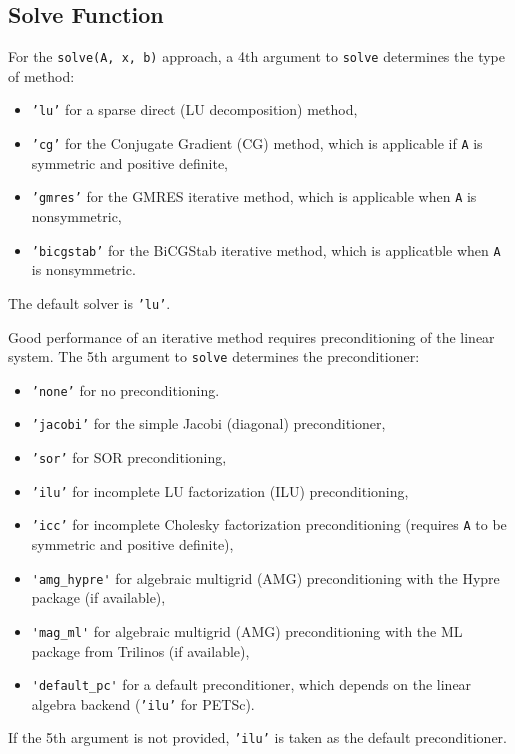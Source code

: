 \subsection{Solve Function}

For the {\fontsize{12pt}{12pt}\texttt{solve(A, x, b)}} approach, a 4th argument to {\fontsize{12pt}{12pt}\texttt{solve}}
determines the type of method: 
\begin{itemize}
\item {\fontsize{12pt}{12pt}\texttt{'lu'}} for a sparse direct (LU decomposition) method, 
\item {\fontsize{12pt}{12pt}\texttt{'cg'}} for the Conjugate Gradient (CG) method, which is
applicable if {\fontsize{12pt}{12pt}\texttt{A}} is symmetric and positive definite,
\item {\fontsize{12pt}{12pt}\texttt{'gmres'}} for
the GMRES iterative method, which is applicable when {\fontsize{12pt}{12pt}\texttt{A}} is nonsymmetric,
\item {\fontsize{12pt}{12pt}\texttt{'bicgstab'}} for
the BiCGStab iterative method, which is applicatble when {\fontsize{12pt}{12pt}\texttt{A}} is
nonsymmetric.
\end{itemize}
The default solver is {\fontsize{12pt}{12pt}\texttt{'lu'}}.

Good performance of an iterative method requires preconditioning of
the linear system. The 5th argument to {\fontsize{12pt}{12pt}\texttt{solve}} determines the
preconditioner:
\begin{itemize}
\item {\fontsize{12pt}{12pt}\texttt{'none'}} for no preconditioning.
\item {\fontsize{12pt}{12pt}\texttt{'jacobi'}} for the simple Jacobi (diagonal) preconditioner,
\item {\fontsize{12pt}{12pt}\texttt{'sor'}} for SOR preconditioning,
\item {\fontsize{12pt}{12pt}\texttt{'ilu'}} for incomplete LU factorization (ILU) preconditioning,
\item {\fontsize{12pt}{12pt}\texttt{'icc'}} for incomplete Cholesky factorization preconditioning
(requires {\fontsize{12pt}{12pt}\texttt{A}} to be symmetric and positive definite),
\item {\fontsize{12pt}{12pt}\verb!'amg_hypre'!} for algebraic multigrid (AMG) preconditioning
with the Hypre package (if available),
\item {\fontsize{12pt}{12pt}\verb!'mag_ml'!} for algebraic multigrid (AMG) preconditioning
with the ML package from Trilinos (if available),
\item {\fontsize{12pt}{12pt}\verb!'default_pc'!} for a default preconditioner, which depends
on the linear algebra backend ({\fontsize{12pt}{12pt}\texttt{'ilu'}} for PETSc).
\end{itemize}
If the 5th argument is not provided, {\fontsize{12pt}{12pt}\texttt{'ilu'}} is taken as the default
preconditioner.


